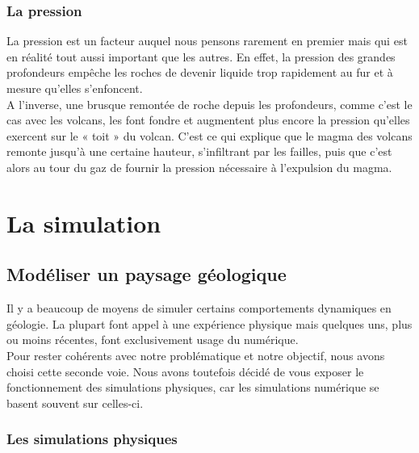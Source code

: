 \documentclass[a4paper,11pt]{article}
\begin{document}
\subsubsection{La pression}

La pression est un facteur auquel nous pensons rarement en premier mais qui est en réalité tout aussi important que les autres.
En effet, la pression des grandes profondeurs empêche les roches de devenir liquide trop rapidement au fur et à mesure qu'elles s'enfoncent.\\
A l'inverse, une brusque remontée de roche depuis les profondeurs, comme c'est le cas avec les volcans, les font fondre et augmentent plus encore la pression qu'elles exercent sur le « toit » du volcan.
C'est ce qui explique que le magma des volcans remonte jusqu'à une certaine hauteur, s'infiltrant par les failles, puis que c'est alors au tour du gaz de fournir la pression nécessaire à l'expulsion du magma.

\section{La simulation}

\subsection{Modéliser un paysage géologique}

Il y a beaucoup de moyens de simuler certains comportements dynamiques en géologie.
La plupart font appel à une expérience physique mais quelques uns, plus ou moins récentes, font exclusivement usage du numérique.\\
Pour rester cohérents avec notre problématique et notre objectif, nous avons choisi cette seconde voie. Nous avons toutefois décidé de vous exposer le fonctionnement des simulations physiques, car les simulations numérique se basent souvent sur celles-ci.

\subsubsection{Les simulations physiques}
\end{document}
